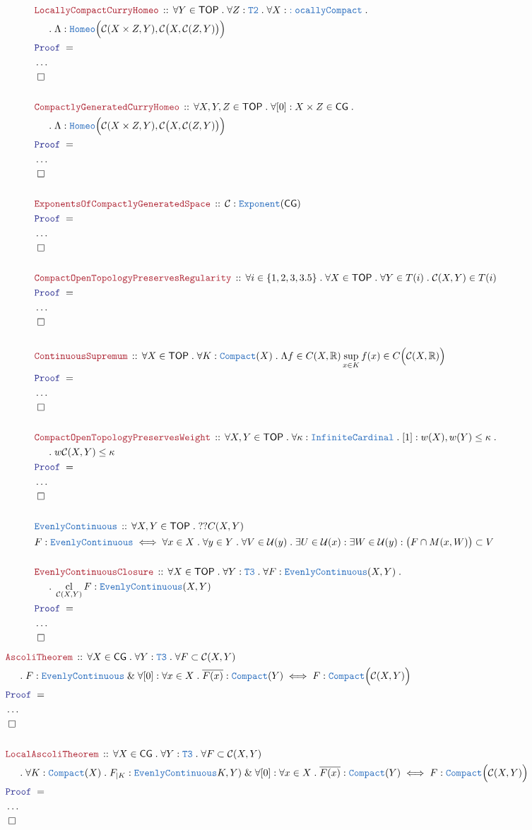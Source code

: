 \documentclass[12pt]{scrartcl}
\newcommand{\TYPE}[1]{\textcolor{NavyBlue}{\mathtt{#1}}}
\newcommand{\LOGIC}[1]{\textcolor{Blue}{\mathtt{#1}}}
\newcommand{\THM}[1]{\textcolor{Maroon}{\mathtt{#1}}}
\renewcommand{\.}{\; . \;}
\newcommand{\Theorem}[2]{& \THM{#1} \, :: \, #2 \\ & \Proof = \\ }
\newcommand{\DeclareType}[2]{& \TYPE{#1} \, :: \, #2 \\}
\newcommand{\DefineType}[3]{& #1 : \TYPE{#2} \iff #3 \\}
\newcommand{\NewLine}{\\ & \kern 1pc}
\newcommand{\Page}[1]{ \begin{align*} #1 \end{align*}   }
\newcommand{\NoProof}{ & \ldots \\ \EndProof}
\renewcommand{\And}{\; \& \;}
\newcommand{\Reals}{\mathbb{R} }
\newcommand{\QED}{\; \square}
\newcommand{\EndProof}{& \QED \\}
\newcommand{\Proof}{\LOGIC{Proof} \; }
\newcommand{\C}{\mathcal{C}}
\DeclareMathOperator*{\cl}{cl}
\newcommand{\TOP}{\mathsf{TOP}}
\newcommand{\CG}{\mathsf{CG}}
\newcommand{\U}{\mathcal{U}}
\begin{document}
\Page{
	\Theorem{LocallyCompactCurryHomeo}
	{
		\forall Y \in \TOP \.
		\forall Z : \TYPE{T2} \. 
		\forall X : \TYPE{:ocallyCompact} \.
		\NewLine \. 
		\Lambda : \TYPE{Homeo}\Big( \C(X \times Z, Y), \C\big(X,\C(Z,Y)\big) \Big)
	}
	\NoProof
	\\
	\Theorem{CompactlyGeneratedCurryHomeo}
	{
		\forall X,Y,Z \in \TOP \.
		\forall [0] : X \times Z \in \CG \. 
		\NewLine \. 
		\Lambda : \TYPE{Homeo}\Big( \C(X \times Z, Y), \C\big(X,\C(Z,Y)\big) \Big)
	}
	\NoProof
	\\
	\Theorem{ExponentsOfCompactlyGeneratedSpace}
	{
		\C : \TYPE{Exponent}(\CG)
	}
	\NoProof
	\\
	\Theorem{CompactOpenTopologyPreservesRegularity}
	{
		\forall i \in \{1,2,3,3.5 \} \. 
		\forall X \in \TOP \.
		\forall Y \in T(i) \.
		\C(X,Y) \in T(i)
	}
	\NoProof
	\\
	\Theorem{ContinuousSupremum}
	{
		\forall X \in \TOP \.
		\forall K : \TYPE{Compact}(X) \. 
		\Lambda f \in  C(X,\Reals)  \sup_{x \in K} f(x)  \in C\Big( \C(X,\Reals) \Big)
	}
	\NoProof
	\\
	\Theorem{CompactOpenTopologyPreservesWeight}
	{
		\forall X, Y \in \TOP \. 
		\forall \kappa : \TYPE{InfiniteCardinal} \.
		[1] : w(X),w(Y) \le \kappa \. \NewLine \. 
		w\C(X,Y) \le \kappa
	}
	\NoProof
	\\
	\DeclareType{EvenlyContinuous}
	{
		\forall X,Y \in \TOP \. ??C(X,Y) 
	}
	\DefineType{F}{\TYPE{EvenlyContinuous}}{
		\forall x \in X \. \forall y \in Y \.  \forall V \in \U(y) \.
		\exists U \in \U(x) : \exists W \in \U(y) : 
		\big(F \cap M(x,W)\big) \subset V
	}
	\\
	\Theorem{EvenlyContinuousClosure}
	{
		\forall X \in \TOP \.
		\forall Y : \TYPE{T3} \.
		\forall F : \TYPE{EvenlyContinuous}(X,Y) \. \NewLine \.
		\cl_{\C(X,Y)} F : \TYPE{EvenlyContinuous}(X,Y)
	}
	\NoProof
}
\Page{
	\Theorem{AscoliTheorem}
	{
		\forall X \in \CG \.
		\forall Y  : \TYPE{T3} \.
		\forall F \subset \C(X,Y)   \NewLine \.
		F : \TYPE{EvenlyContinuous}  \And  
		\forall [0] : \forall x \in X \. \overline{F(x)} : \TYPE{Compact}(Y) \iff
		F : \TYPE{Compact}\Big( \C(X,Y)\Big)
	}
	\NoProof
	\\
	\Theorem{LocalAscoliTheorem}
	{
		\forall X \in \CG \.
		\forall Y  : \TYPE{T3} \.
		\forall F \subset \C(X,Y)   \NewLine \.
		\forall K : \TYPE{Compact}(X) \. F_{|K} : \TYPE{EvenlyContinuous}K,Y )  \And  
		\forall [0] : \forall x \in X \. \overline{F(x)} : \TYPE{Compact}(Y) \iff
		F : \TYPE{Compact}\Big( \C(X,Y)\Big)
	}
	\NoProof
}
\newpage
\end{document}
